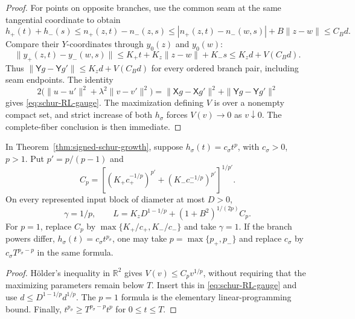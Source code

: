 \begin{proof}
For points on opposite branches, use the common seam at the same
tangential coordinate to obtain
\[
 h_+(t)+h_-(s)
 \le n_+(z,t)-n_-(z,s)
 \le|n_+(z,t)-n_-(w,s)|+B\|z-w\|
 \le C_Bd.
\]
Compare their \(Y\)-coordinates through \(y_0(z)\) and \(y_0(w)\):
\[
 \|y_+(z,t)-y_-(w,s)\|
 \le K_+t+K_z\|z-w\|+K_-s
 \le K_zd+V(C_Bd).
\]
Thus \(\|\mathsf Yg-\mathsf Yg'\|\le K_zd+V(C_Bd)\) for every
ordered branch pair, including seam endpoints.  The identity
\[
 2\bigl(\|u-u'\|^2+\lambda^2\|v-v'\|^2\bigr)
 =\|\mathsf Xg-\mathsf Xg'\|^2+\|\mathsf Yg-\mathsf Yg'\|^2
\]
gives \eqref{eq:schur-RL-gauge}.
The maximization defining \(V\) is over a nonempty compact set, and
strict increase of both \(h_\sigma\) forces \(V(v)\to0\) as
\(v\downarrow0\).  The complete-fiber conclusion is then immediate.
\end{proof}

\begin{corollary}
\label{cor:schur-power-constants}
In Theorem~\ref{thm:signed-schur-growth}, suppose
\(h_\sigma(t)=c_\sigma t^p\), with \(c_\sigma>0\), \(p>1\).
Put \(p'=p/(p-1)\) and
\[
 C_{p}=\left[
  (K_+c_+^{-1/p})^{p'}+(K_-c_-^{-1/p})^{p'}
 \right]^{1/p'}.
\]
On every represented input block of diameter at most \(D>0\),
\[
 \boxed{\quad\gamma=1/p,\qquad
 L=K_zD^{1-1/p}+(1+B^2)^{1/(2p)}C_p.\quad}
 \tag{S15}\label{eq:schur-explicit-L}
\]
For \(p=1\), replace \(C_p\) by
\(\max\{K_+/c_+,K_-/c_-\}\) and take \(\gamma=1\).
If the branch powers differ, \(h_\sigma(t)=c_\sigma t^{p_\sigma}\),
one may take \(p=\max\{p_+,p_-\}\) and replace
\(c_\sigma\) by \(c_\sigma T^{p_\sigma-p}\) in the same formula.
\end{corollary}

\begin{proof}
H\"older's inequality in \(\mathbb R^2\) gives
\(V(v)\le C_pv^{1/p}\), without requiring that the maximizing
parameters remain below \(T\).  Insert this in
\eqref{eq:schur-RL-gauge} and use
\(d\le D^{1-1/p}d^{1/p}\).  The \(p=1\) formula is the elementary
linear-programming bound.  Finally,
\(t^{p_\sigma}\ge T^{p_\sigma-p}t^p\) for \(0\le t\le T\).
\end{proof}

